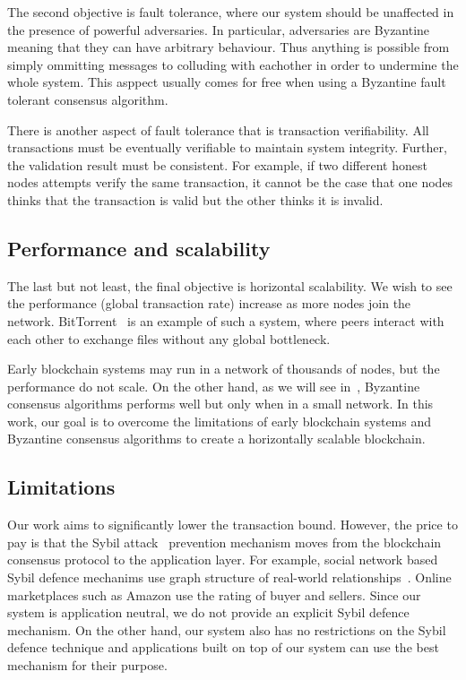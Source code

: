 The second objective is fault tolerance,
where our system should be unaffected in the presence of powerful adversaries.
In particular, adversaries are Byzantine meaning that they can have arbitrary behaviour.
Thus anything is possible from simply ommitting messages to colluding with eachother in order to undermine the whole system.
This asppect usually comes for free when using a Byzantine fault tolerant consensus algorithm.

There is another aspect of fault tolerance that is transaction verifiability.
All transactions must be eventually verifiable to maintain system integrity.
Further, the validation result must be consistent.
For example, if two different honest nodes attempts verify the same transaction,
it cannot be the case that one nodes thinks that the transaction is valid but the other thinks it is invalid.


\subsection{Performance and scalability}

The last but not least, the final objective is horizontal scalability.
We wish to see the performance (global transaction rate) increase as more nodes join the network.
BitTorrent~\cite{cohen2003incentives} is an example of such a system,
where peers interact with each other to exchange files without any global bottleneck.

Early blockchain systems may run in a network of thousands of nodes, but the performance do not scale.
On the other hand, as we will see in~, Byzantine consensus algorithms performs well but only when in a small network.
In this work, our goal is to overcome the limitations of early blockchain systems and Byzantine consensus algorithms to create a horizontally scalable blockchain.

\subsection{Limitations}
Our work aims to significantly lower the transaction bound.
However, the price to pay is that the Sybil attack~\cite{douceur2002sybil} prevention mechanism moves from the blockchain consensus protocol to the application layer.
For example, social network based Sybil defence mechanims use graph structure of real-world relationships~\cite{yu2006sybilguard}.
Online marketplaces such as Amazon use the rating of buyer and sellers.
Since our system is application neutral, we do not provide an explicit Sybil defence mechanism.
On the other hand, our system also has no restrictions on the Sybil defence technique
and applications built on top of our system can use the best mechanism for their purpose.

